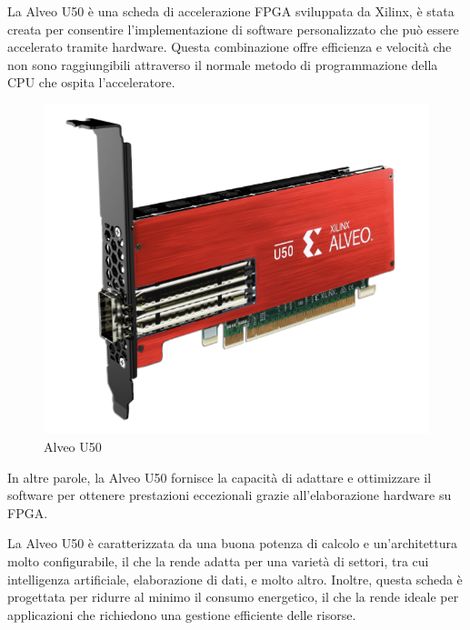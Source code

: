 \vspace{0,3cm}


La Alveo U50 è una scheda di accelerazione FPGA sviluppata da Xilinx, è stata creata per consentire l'implementazione di software personalizzato che può essere accelerato tramite hardware. Questa combinazione offre efficienza e velocità che non sono raggiungibili attraverso il normale metodo di programmazione della CPU che ospita l'acceleratore. 

\begin{figure}[h!]
    \centering
    \includegraphics[scale=0.4]{images/Capitolo2/2_im.png} 
    \caption{Alveo U50}
    \label{U50}
\end{figure}

In altre parole, la Alveo U50 fornisce la capacità di adattare e ottimizzare il software per ottenere prestazioni eccezionali grazie all'elaborazione hardware su FPGA.

La Alveo U50 è caratterizzata da una buona potenza di calcolo e un'architettura molto configurabile, il che la rende adatta per una varietà di settori, tra cui intelligenza artificiale, elaborazione di dati, e molto altro. Inoltre, questa scheda è progettata per ridurre al minimo il consumo energetico, il che la rende ideale per applicazioni che richiedono una gestione efficiente delle risorse.

\vspace{0,3cm}

